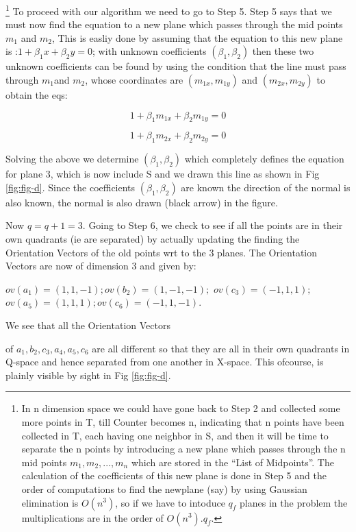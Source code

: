 \documentclass[english]{article}
\begin{document}
\footnote{In n dimension space we could have gone back to Step 2 and collected
some more points in T, till Counter becomes n, indicating that n points
have been collected in T, each having one neighbor in S, and then
it will be time to separate the n points by introducing a new plane
which passes through the n mid points $m_{1},m_{2},...,m_{n}$ which
are stored in the {}``List of Midpoints''. The calculation of the
coefficients of this new plane is done in Step 5 and  the order of computations
to find the newplane (say) by using Gaussian elimination is $O(n^{3})$,
so if we have to intoduce $q_{f}$ planes in the problem the multiplications
are in the order of $O(n^{3}).q_{f}$.}
To proceed with our algorithm we need to go to Step 5. Step 5 says
that we must now find the equation to a new plane which passes through
the mid points $m_{1}$ and $m_{2}$, This is easliy done by assuming
that the equation to this new plane is :$1+\beta_{1}x+\beta_{2}y=0$;
with unknown coefficients $(\beta_{1},\beta_{2})$ then these two
unknown coefficients can be found by using the condition that the
line must pass through $m_{1}$and $m_{2}$, whose coordinates are
$(m_{1x},m_{1y})$ and $(m_{2x},m_{2y})$ to obtain the eqs:

\begin{equation}
1+\beta_{1}m_{1x}+\beta_{2}m_{1y}=0
\end{equation}


\begin{equation}
1+\beta_{1}m_{2x}+\beta_{2}m_{2y}=0
\end{equation}


Solving the above we determine $(\beta_{1},\beta_{2})$ which completely
defines the equation for plane 3,  which is now include S and  we drawn this line as shown in Fig \ref{fig:fig-d}. Since the coefficients $(\beta_{1},\beta_{2})$ are known the direction of the normal is also known, the normal is also drawn (black arrow) in the figure.

Now $q=q+1=3$. Going to Step 6, we check to see if all the points
are in their own quadrants (ie are separated) by actually updating
the finding the Orientation Vectors of the old points wrt to the 3
planes. The Orientation Vectors are now of dimension 3 and given by:

$ov(a_{1})=(1,1,-1); ov(b_{2})=(1,-1,-1);$ $ov(c_{3})=(-1,1,1);$
$ ov(a_{5})=(1,1,1); ov(c_{6})=(-1,1,-1)$.

We see that all the Orientation Vectors 

of $a_{1},b_{2},c_{3},a_{4},a_{5},c_{6}$ are all different so that
they are all in their own quadrants in Q-space and hence separated
from one another in X-space. This ofcourse, is plainly visible by
sight in Fig \ref{fig:fig-d}. 
\end{document}
